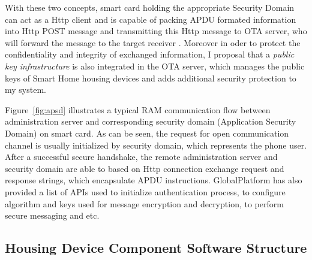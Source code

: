 With these two concepts, smart card holding the appropriate Security Domain can act as a Http client and is capable of packing APDU formated information into Http POST message and transmitting this Http message to OTA server, who will forward the message to the target receiver \cite{ramGP}. Moreover in oder to protect the confidentiality and integrity of exchanged information, I proposal that a \emph{public key infrastructure} is also integrated in the OTA server, which manages the public keys of Smart Home housing devices and adds additional security protection to my system.
 
Figure~\ref{fig:apsd} illustrates a typical RAM communication flow between administration server and corresponding security domain (Application Security Domain) on smart card. As can be seen, the request for open communication channel is usually initialized by security domain, which represents the phone user. After a successful secure handshake, the remote administration server and security domain are able to based on Http connection exchange request and response strings, which encapsulate APDU instructions. GlobalPlatform has also provided  a list of APIs used to initialize authentication process, to configure algorithm and keys used for message encryption and decryption, to perform secure messaging and etc.

\subsection{Housing Device Component Software Structure}

